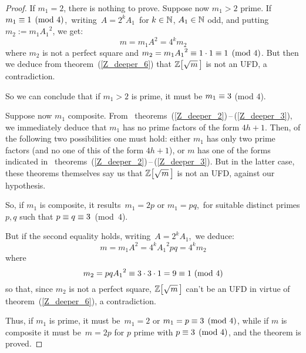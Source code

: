 \begin{proof}
%
If $m_1 = 2$, there is nothing to prove.
Suppose now $m_1 > 2$ prime. If\,
$m_1 \equiv1 \pmod 4$, \,writing\,
$A = 2^k A_1$\, for $k \in \mathbb{N}$, $A_1 \in \mathbb{N}$ odd, and
putting\, $m_2:= {m_1}{A_1}^2$, we get:
$$ m = m_1 A^2 = 4^k m_2 $$
where $m_2$ is not a perfect square and
$m_2 = {m_1}{A_1}^2 \equiv 1\cdot1 \equiv 1 \pmod 4$.
But then we deduce from theorem~(\ref{Z_deeper_6}) that
$\ZZ{m}$ is not an UFD, a contradiction.

So we can conclude that if $m_1 > 2$ is prime, it must
be $m_1 \equiv 3$ (mod $4$).

Suppose now $m_1$ composite. From \mbox{%
theorems (\ref{Z_deeper_2})\,--\,(\ref{Z_deeper_3}),}
we immediately deduce that $m_1$ has no prime factors of
the form $4h + 1$. Then, of the following two
possibilities one must hold: either $m_1$ has only two
prime factors (and no one of this of the form $4h + 1$),
or $m$ has one of the forms indicated in \mbox{%
theorems (\ref{Z_deeper_2})\,--\,(\ref{Z_deeper_3}).}
But in the latter case, these theorems themselves say us
that $\ZZ{m}$ is not an UFD, against our
hypothesis.

So, if $m_1$ is composite, it results\, $m_1 = 2p$ or
$m_1 = pq$,\, for suitable distinct primes $p,q$ such
that \mbox{$p \equiv q \equiv 3$ (mod $4$).}

But if the second equality holds, writing\,
$A = 2^k A_1$,\, we deduce:
$$ m = m_1 A^2 = 4^k {A_1}^2 pq = 4^k m_2 $$
where
$$
  m_2 = pq {A_1}^2 \equiv 3 \cdot 3 \cdot 1 = 9
  \equiv 1\ \mathrm{(mod\ 4)}
$$
so that, since $m_2$ is not a perfect square,
$\ZZ{m}$ can't be an UFD in virtue of
theorem~(\ref{Z_deeper_6}), a contradiction.

Thus, if $m_1$ is prime, it must be\, $m_1 = 2$ or
$m_1 = p \equiv 3 \pmod 4$, while if $m$
is composite it must be\, $m = 2p$ for $p$ prime
with $p \equiv 3 \pmod 4$, and the
theorem is proved.
%
\end{proof}

